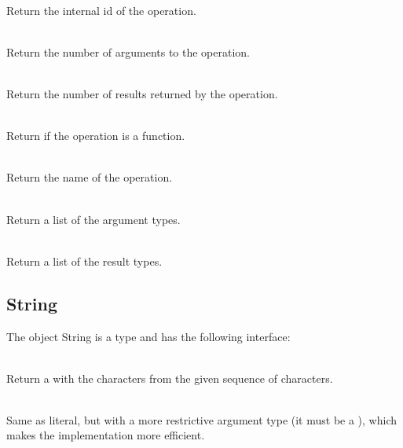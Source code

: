 \begin{desc}
  \item[\kw{function}  getID \returns{} \/\LB{}\tn{Integer}\/\RB{}]~\\
    Return the internal id of the operation.
  \item[\kw{function}  getNArgs \returns{} \/\LB{}\tn{Integer}\/\RB{}]~\\
    Return the number of arguments to the operation.
  \item[\kw{function}  getNRess \returns{} \/\LB{}\tn{Integer}\/\RB{}]~\\
    Return the number of results returned by the operation.
  \item[\kw{function}  getIsFunction \returns{} \/\LB{}\tn{Boolean}\/\RB{}]~\\
    Return  if the operation is a function.
  \item[\kw{function}  getName \returns{} \/\LB{}\tn{String}\/\RB{}]~\\
    Return the name of the operation.
  \item[\kw{function}  getArguments \returns{} \/\LB{}AParamList\/\RB{}]~\\
    Return a list of the argument types.    
  \item[\kw{function}  getResults   \returns{} \/\LB{}AParamList\/\RB{}]~\\
    Return a list of the result types.
\end{desc}

\subsection{String}
\label{builtin String}

The object String is a type and has the following interface:

\begin{desc}
  \item[\kw{operation} Literal\/\LB{}rep \CO{} Sequence.of\/\LB{}Character\/\RB{}, offset \CO{} \tn{Integer}, len \CO{} \tn{Integer}\/\RB{} \returns{} \/\LB{}\tn{String}\/\RB{}]~\\
    Return a  with the characters from the given sequence of
    characters. 
  \item[\kw{operation} FLiteral\/\LB{}rep \CO{} VectorOfChar, offset \CO{} \tn{Integer}, len \CO{} \tn{Integer}\/\RB{} \returns{} \/\LB{}\tn{String}\/\RB{}]~\\
    Same as literal, but with a more restrictive argument type (it must be a
    ), which makes the implementation more efficient.
\end{desc}

